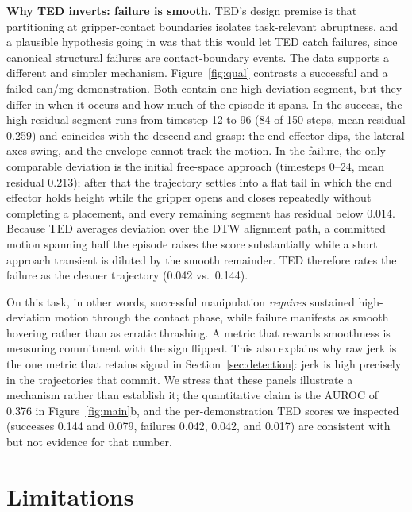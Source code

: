 \documentclass{article}
\begin{document}
\textbf{Why TED inverts: failure is smooth.} TED's design premise is that
partitioning at gripper-contact boundaries isolates task-relevant
abruptness, and a plausible hypothesis going in was that this would let TED
catch failures, since canonical structural failures are contact-boundary
events. The data supports a different and simpler mechanism.
Figure~\ref{fig:qual} contrasts a successful and a failed can/mg
demonstration. Both contain one high-deviation segment, but they differ in
when it occurs and how much of the episode it spans. In the success, the
high-residual segment runs from timestep 12 to 96 (84 of 150 steps, mean
residual 0.259) and coincides with the descend-and-grasp: the end effector
dips, the lateral axes swing, and the envelope cannot track the motion. In
the failure, the only comparable deviation is the initial free-space
approach (timesteps 0--24, mean residual 0.213); after that the trajectory
settles into a flat tail in which the end effector holds height while the
gripper opens and closes repeatedly without completing a placement, and
every remaining segment has residual below 0.014. Because TED averages
deviation over the DTW alignment path, a committed motion spanning half the
episode raises the score substantially while a short approach transient is
diluted by the smooth remainder. TED therefore rates the failure as the
cleaner trajectory (0.042 vs.\ 0.144).

On this task, in other words, successful manipulation \emph{requires}
sustained high-deviation motion through the contact phase, while failure
manifests as smooth hovering rather than as erratic thrashing. A metric that
rewards smoothness is measuring commitment with the sign flipped. This also
explains why raw jerk is the one metric that retains signal in
Section~\ref{sec:detection}: jerk is high precisely in the trajectories that
commit. We stress that these panels illustrate a mechanism rather than
establish it; the quantitative claim is the AUROC of 0.376 in
Figure~\ref{fig:main}b, and the per-demonstration TED scores we inspected
(successes 0.144 and 0.079, failures 0.042, 0.042, and 0.017) are
consistent with but not evidence for that number.

\section{Limitations}
\label{sec:limitations}
\end{document}
